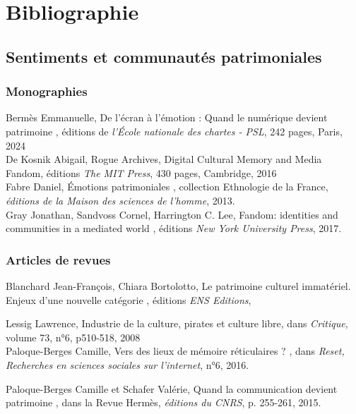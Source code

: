 \chapter{Bibliographie}

\section*{Sentiments et communautés patrimoniales}

\subsection*{Monographies}
Bermès Emmanuelle, \guillemetleft De l'écran à l'émotion : Quand le numérique devient patrimoine \guillemetright, éditions de \textit{l'École nationale des chartes - PSL}, 242 pages, Paris, 2024 \\

De Kosnik Abigail, \guillemetleft Rogue Archives, Digital Cultural Memory and Media Fandom, éditions \textit{The MIT Press}, 430 pages, Cambridge, 2016 \\

Fabre Daniel, \og Émotions patrimoniales \fg, collection Ethnologie de la France,\textit{ éditions de la Maison des sciences de l’homme}, 2013. \\

Gray Jonathan, Sandvoss Cornel, Harrington C. Lee, \og Fandom: identities and communities in a mediated world \fg, éditions \textit{New York University Press}, 2017.\\

\subsection*{Articles de revues}
Blanchard Jean-François, \og Chiara Bortolotto, Le patrimoine culturel immatériel. Enjeux d’une nouvelle catégorie \fg, éditions \textit{ENS Editions}, 

Lessig Lawrence, \guillemetleft Industrie de la culture, pirates et \guillemetleft culture libre\guillemetright \guillemetright, dans \textit{Critique}, volume 73, n°6, p510-518, 2008\\

Paloque-Berges Camille, \og Vers des lieux de mémoire réticulaires ? \fg, dans \textit{Reset, Recherches en sciences sociales sur l'internet}, n°6, 2016. 

Paloque-Berges Camille et Schafer Valérie, \og Quand la communication devient patrimoine \fg, dans la Revue Hermès, \textit{éditions du CNRS}, p. 255-261, 2015. \\

